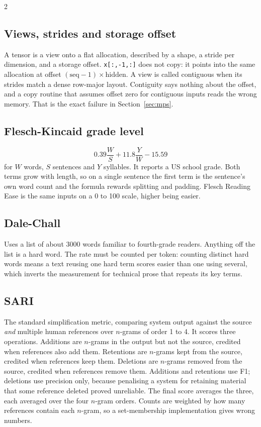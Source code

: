 \documentclass[twocolumn,10pt,a4paper]{article}
\newcommand{\code}[1]{\texttt{\small #1}}
\begin{document}
\begin{multicols}{2}
\subsection*{Views, strides and storage offset}
A tensor is a view onto a flat allocation, described by a shape, a stride per
dimension, and a storage offset. \code{x[:,-1,:]} does not copy: it points into
the same allocation at offset $(\text{seq}-1)\times\text{hidden}$. A view is
called contiguous when its strides match a dense row-major layout. Contiguity
says nothing about the offset, and a copy routine that assumes offset zero for
contiguous inputs reads the wrong memory. That is the exact failure in
Section~\ref{sec:mps}.

\subsection*{Flesch-Kincaid grade level}
\[
0.39\frac{W}{S} + 11.8\frac{Y}{W} - 15.59
\]
for $W$ words, $S$ sentences and $Y$ syllables. It reports a US school grade.
Both terms grow with length, so on a single sentence the first term is the
sentence's own word count and the formula rewards splitting and padding. Flesch
Reading Ease is the same inputs on a 0 to 100 scale, higher being easier.

\subsection*{Dale-Chall}
Uses a list of about 3000 words familiar to fourth-grade readers. Anything off
the list is a hard word. The rate must be counted per token: counting distinct
hard words means a text reusing one hard term scores easier than one using
several, which inverts the measurement for technical prose that repeats its key
terms.

\subsection*{SARI}
The standard simplification metric, comparing system output against the source
\emph{and} multiple human references over $n$-grams of order 1 to 4. It scores
three operations. Additions are $n$-grams in the output but not the source,
credited when references also add them. Retentions are $n$-grams kept from the
source, credited when references keep them. Deletions are $n$-grams removed from
the source, credited when references remove them. Additions and retentions use
F1; deletions use precision only, because penalising a system for retaining
material that some reference deleted proved unreliable. The final score averages
the three, each averaged over the four $n$-gram orders. Counts are weighted by
how many references contain each $n$-gram, so a set-membership implementation
gives wrong numbers.


\end{multicols}
\end{document}
